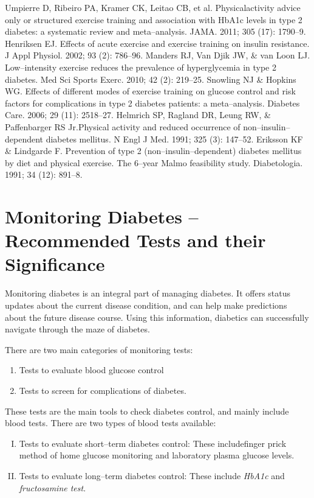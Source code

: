 \begin{thebibliography}{99}
 Umpierre D, Ribeiro PA, Kramer CK, Leitao CB, et al. Physical\break activity advice only or structured exercise training and association with HbA1c levels in type 2 diabetes: a systematic review and meta–analysis. JAMA. 2011; 305 (17): 1790–9.
 Henriksen EJ. Effects of acute exercise and exercise training on insulin resistance. J Appl Physiol. 2002; 93 (2): 786–96.
 Manders RJ, Van Djik JW, \& van Loon LJ. Low–intensity exercise reduces the prevalence of hyperglycemia in type 2 diabetes. Med Sci Sports Exerc. 2010; 42 (2): 219–25.
 Snowling NJ \& Hopkins WG. Effects of different modes of exercise training on glucose control and risk factors for complications in type 2 diabetes patients: a meta–analysis. Diabetes Care. 2006; 29 (11): 2518–27.
 Helmrich SP, Ragland DR, Leung RW, \& Paffenbarger RS Jr.\break Physical activity and reduced occurrence of non–insulin–dependent diabetes mellitus. N Engl J Med. 1991; 325 (3): 147–52.
 Eriksson KF \& Lindgarde F. Prevention of type 2 (non–insulin–dependent) diabetes mellitus by diet and physical exercise. The 6–year Malmo feasibility study. Diabetologia. 1991; 34 (12): 891–8.
\end{thebibliography}


\chapter{Monitoring Diabetes – Recommended Tests and their Significance}\label{chap24}

Monitoring diabetes is an integral part of managing diabetes. It offers status updates about the current disease condition, and can help make predictions about the future disease course. Using this information, diabetics can successfully navigate through the maze of diabetes.

\noindent There are two main categories of monitoring tests:
\begin{enumerate}
\itemsep=0pt
\item Tests to evaluate blood glucose control
\item Tests to screen for complications of diabetes.
\end{enumerate}


These tests are the main tools to check diabetes control, and mainly include blood tests. There are two types of blood tests available:
\begin{enumerate}[I.]
\itemsep=0pt
\item Tests to evaluate short–term diabetes control: These include\break finger prick method of home glucose monitoring and laboratory plasma glucose levels.
\item Tests to evaluate long–term diabetes control: These include \textit{HbA1c} and \textit{fructosamine test}.
\end{enumerate}

